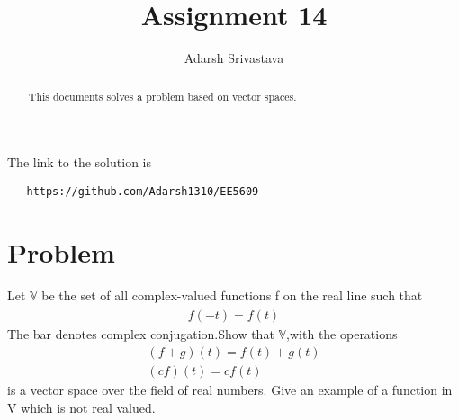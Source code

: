 \documentclass[journal,12pt,twocolumn]{IEEEtran}
\begin{document}
       \def\rightbox#1{\makebox[0in][r]{#1}}
       \def\centbox#1{\makebox[0in]{#1}}
       \def\topbox#1{\raisebox{-\baselineskip}[0in][0in]{#1}}
       \def\midbox#1{\raisebox{-0.5\baselineskip}[0in][0in]{#1}}
  \vspace{3cm}
  \title{Assignment 14}
  \author{Adarsh Srivastava}
  \maketitle
  \newpage
  \bigskip
  \renewcommand{\thetable}{\theenumi}
  The link to the solution is
  \begin{lstlisting}
   https://github.com/Adarsh1310/EE5609
  \end{lstlisting}
  \begin{abstract}
  This documents solves a problem based on vector spaces.
  \end{abstract}
   \section{\textbf{Problem}}
   Let $\mathbb{V}$ be the set of all complex-valued functions f on the real line such that
   \begin{align*}f(-t)=\overline{f(t)}\end{align*}The bar denotes complex conjugation.Show that $\mathbb{V}$,with the operations\begin{align*}(f+g)(t)=f(t)+g(t)\\(cf)(t)=cf(t)\end{align*} is a vector space over the field of real numbers. Give an example of a function in V which is not real valued.
\end{document}
